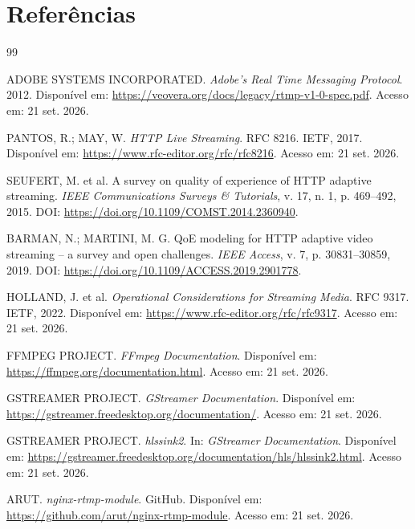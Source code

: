 \section{Referências}

\begin{thebibliography}{99}

ADOBE SYSTEMS INCORPORATED. \textit{Adobe's Real Time Messaging Protocol}. 2012. Disponível em: \url{https://veovera.org/docs/legacy/rtmp-v1-0-spec.pdf}. Acesso em: 21 set. 2026.

PANTOS, R.; MAY, W. \textit{HTTP Live Streaming}. RFC 8216. IETF, 2017. Disponível em: \url{https://www.rfc-editor.org/rfc/rfc8216}. Acesso em: 21 set. 2026.

SEUFERT, M. et al. A survey on quality of experience of HTTP adaptive streaming. \textit{IEEE Communications Surveys \& Tutorials}, v. 17, n. 1, p. 469--492, 2015. DOI: \url{https://doi.org/10.1109/COMST.2014.2360940}.

BARMAN, N.; MARTINI, M. G. QoE modeling for HTTP adaptive video streaming -- a survey and open challenges. \textit{IEEE Access}, v. 7, p. 30831--30859, 2019. DOI: \url{https://doi.org/10.1109/ACCESS.2019.2901778}.

HOLLAND, J. et al. \textit{Operational Considerations for Streaming Media}. RFC 9317. IETF, 2022. Disponível em: \url{https://www.rfc-editor.org/rfc/rfc9317}. Acesso em: 21 set. 2026.

FFMPEG PROJECT. \textit{FFmpeg Documentation}. Disponível em: \url{https://ffmpeg.org/documentation.html}. Acesso em: 21 set. 2026.

GSTREAMER PROJECT. \textit{GStreamer Documentation}. Disponível em: \url{https://gstreamer.freedesktop.org/documentation/}. Acesso em: 21 set. 2026.

GSTREAMER PROJECT. \textit{hlssink2}. In: \textit{GStreamer Documentation}. Disponível em: \url{https://gstreamer.freedesktop.org/documentation/hls/hlssink2.html}. Acesso em: 21 set. 2026.

ARUT. \textit{nginx-rtmp-module}. GitHub. Disponível em: \url{https://github.com/arut/nginx-rtmp-module}. Acesso em: 21 set. 2026.


\end{thebibliography}

